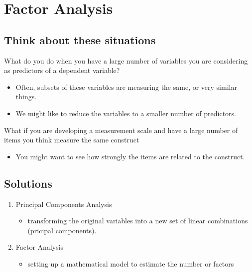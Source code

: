 \documentclass[
]{book}
\providecommand{\tightlist}{%
  \setlength{\itemsep}{0pt}\setlength{\parskip}{0pt}}
\begin{document}
\hypertarget{factor-analysis}{%
\chapter{Factor Analysis}\label{factor-analysis}}

\hypertarget{think-about-these-situations}{%
\section{Think about these situations}\label{think-about-these-situations}}

What do you do when you have a large number of variables you are considering as predictors of a dependent variable?

\begin{itemize}
\tightlist
\item
  Often, subsets of these variables are measuring the same, or very similar things.
\item
  We might like to reduce the variables to a smaller number of predictors.
\end{itemize}

What if you are developing a measurement scale and have a large number of items you think measure the same construct

\begin{itemize}
\tightlist
\item
  You might want to see how strongly the items are related to the construct.
\end{itemize}

\hypertarget{solutions}{%
\section{Solutions}\label{solutions}}

\begin{enumerate}
\def\labelenumi{\arabic{enumi}.}
\item
  Principal Components Analysis

  \begin{itemize}
  \tightlist
  \item
    transforming the original variables into a new set of linear combinations (pricipal components).
  \end{itemize}
\item
  Factor Analysis

  \begin{itemize}
  \tightlist
  \item
    setting up a mathematical model to estimate the number or factors
  \end{itemize}
\end{enumerate}
\end{document}
